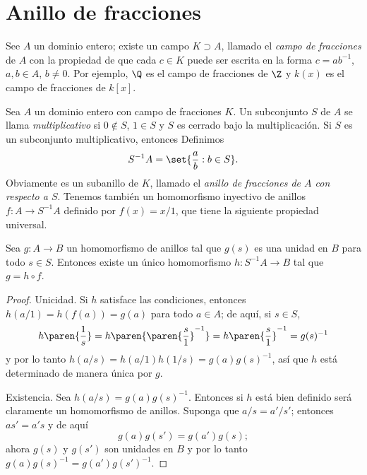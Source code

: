 \section{Anillo de fracciones}

See $A$ un dominio entero; existe un campo $K \supset A$, llamado el \emph{campo de fracciones} de $A$ con la propiedad de que cada $c \in K$ puede ser escrita en la forma $c = ab^{-1}$, $a, b \in A$, $b \neq 0$. Por ejemplo, $\Q$ es el campo de fracciones de $\Z$ y $k(x)$ es el campo de fracciones de $k[x]$.

Sea $A$ un dominio entero con campo de fracciones $K$. Un subconjunto $S$ de $A$ se llama \emph{multiplicativo} si $0 \notin S$, $1 \in S$ y $S$ es cerrado bajo la multiplicación. Si $S$ es un subconjunto multiplicativo, entonces Definimos
\[
  S^{-1}A = \set{\frac{a}{b} : b \in S}.
\]
Obviamente es un subanillo de $K$, llamado el \emph{anillo de fracciones de $A$ con respecto a $S$}. Tenemos también un homomorfismo inyectivo de anillos $f\colon A \to S^{-1}A$ definido por $f(x) = x/1$, que tiene la siguiente propiedad universal.

\begin{proposition}
  Sea $g\colon A \to B$ un homomorfismo de anillos tal que $g(s)$ es una unidad en $B$ para todo $s \in S$. Entonces existe un único homomorfismo $h\colon S^{-1}A \to B$ tal que $g = h \circ f$.
\end{proposition}
\begin{proof}
  Unicidad. Si $h$ satisface las condiciones, entonces $h(a/1) = h(f(a)) = g(a)$ para todo $a \in A$; de aquí, si $s \in S$, 
  \[
    h\paren{\frac{1}{s}} = h\paren{\paren{\frac{s}{1}}^{-1}} =  h\paren{\frac{s}{1}}^{-1} = g(s)^{-1}
  \]
  y por lo tanto $h(a/s) = h(a/1) h(1/s) = g(a)g(s)^{-1}$, así que $h$ está determinado de manera única por $g$.

  Existencia. Sea $h(a/s) = g(a)g(s)^{-1}$. Entonces si $h$ está bien definido será claramente un homomorfismo de anillos. Suponga que $a/s = a'/s'$; entonces $as' = a's$ y de aquí
  \[
    g(a)g(s') = g(a')g(s);
  \]
  ahora $g(s)$ y $g(s')$ son unidades en $B$ y por lo tanto $g(a)g(s)^{-1} = g(a')g(s')^{-1}$.
\end{proof}

